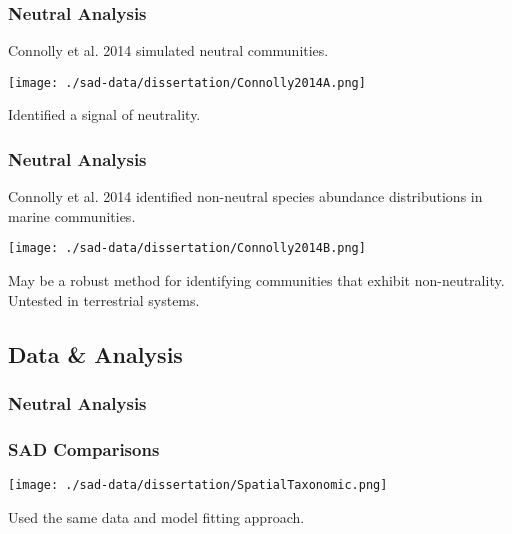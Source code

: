 \documentclass[14pt]{beamer}
\begin{document}
\begin{frame}
\frametitle{Neutral Analysis}
Connolly et al. 2014 simulated neutral communities.\\
\begin{center}
\texttt{[image: ./sad-data/dissertation/Connolly2014A.png]}
\end{center}
Identified a signal of neutrality.\\
\end{frame}

\begin{frame}
\frametitle{Neutral Analysis}
Connolly et al. 2014 identified non-neutral species abundance distributions in marine communities.\\
\begin{center}
\texttt{[image: ./sad-data/dissertation/Connolly2014B.png]}
\end{center}
May be a robust method for identifying communities that exhibit non-neutrality.\\
Untested in terrestrial systems.
\end{frame}


\subsection{Data & Analysis}
\begin{frame}
\frametitle{Neutral Analysis}
\frametitle{SAD Comparisons}
\begin{center}
\texttt{[image: ./sad-data/dissertation/SpatialTaxonomic.png]}
\end{center}
Used the same data and model fitting approach.\\
\end{frame}
\end{document}
